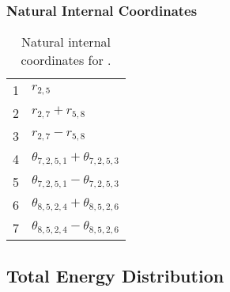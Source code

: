 \documentclass[10pt,oneside]{article}
\begin{document}
\begin{table}[h!]
\subsubsection*{Natural Internal Coordinates}
\centering
\caption{Natural internal coordinates for .}
\small
\begin{tabular}{ll}
\toprule
  1   & $r_{2,5}$ \\
  2   & $r_{2,7} + r_{5,8}$ \\
  3   & $r_{2,7} - r_{5,8}$ \\
  4   & $\theta_{7,2,5,1} + \theta_{7,2,5,3}$ \\
  5   & $\theta_{7,2,5,1} - \theta_{7,2,5,3}$ \\
  6   & $\theta_{8,5,2,4} + \theta_{8,5,2,6}$ \\
  7   & $\theta_{8,5,2,4} - \theta_{8,5,2,6}$ \\
\bottomrule
\end{tabular}
\end{table}

\begin{table}
\subsection*{Total Energy Distribution}
\centering\end{table}

\clearpage

\subsection{}
\end{document}
